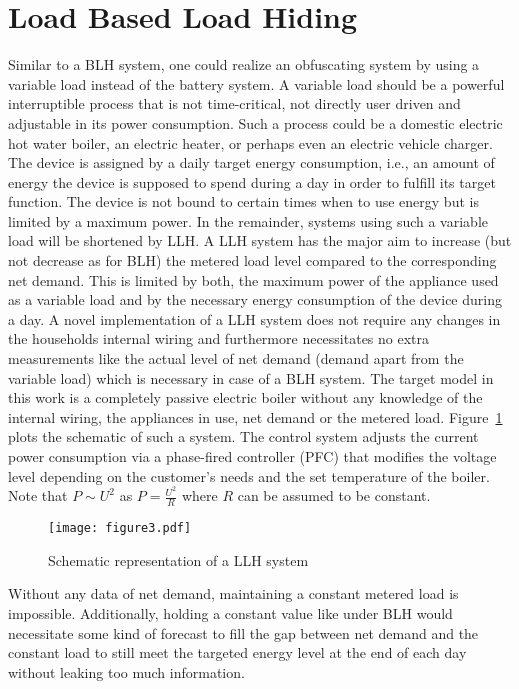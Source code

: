 \documentclass{article}
\begin{document}
\section{Load Based Load Hiding}\label{sec:LLH}
Similar to a \ac{BLH} system, one could realize an obfuscating system by using a variable load instead of the battery system. A variable load should be a powerful interruptible process that is not time-critical, not directly user driven and adjustable in its power consumption. Such a process could be a domestic electric hot water boiler, an electric heater, or perhaps even an electric vehicle charger.
The device is assigned by a daily target energy consumption, i.e., an amount of energy the device is supposed to spend during a day in order to fulfill its target function.
The device is not bound to certain times when to use energy but is limited by a maximum power.
 In the remainder, systems using such a variable load will be shortened by \acf{LLH}.
A \ac{LLH} system has the major aim to increase (but not decrease as for \ac{BLH}) the metered load level compared to the corresponding net demand. This is limited by both, the maximum power of the appliance used as a variable load and by the necessary energy consumption of the device during a day.
A novel implementation of a \ac{LLH} system does not require any changes in the households internal wiring and furthermore necessitates no extra measurements like the actual level of net demand (demand apart from the variable load) which is necessary in case of a BLH system. The target model in this work is a completely passive electric boiler without any knowledge of the internal wiring, the appliances in use, net demand or the metered load. Figure~\ref{llh_system} plots the schematic of such a system. The control system adjusts the current power consumption via a phase-fired controller (PFC) that modifies the voltage level depending on the customer's needs and the set temperature of the boiler. Note that $P \sim U^2$ as $P=\frac{U^2}{R}$ where $R$ can be assumed to be constant.
\begin{figure}[h!]
	\centering
	\texttt{[image: figure3.pdf]}
	\caption{Schematic representation of a \ac{LLH} system}
	\label{llh_system}
\end{figure}
Without any data of net demand, maintaining a constant metered load is impossible. Additionally, holding a constant value like under \ac{BLH} would necessitate some kind of forecast to fill the gap between net demand and the constant load to still meet the targeted energy level at the end of each day without leaking too much information. 
\end{document}
